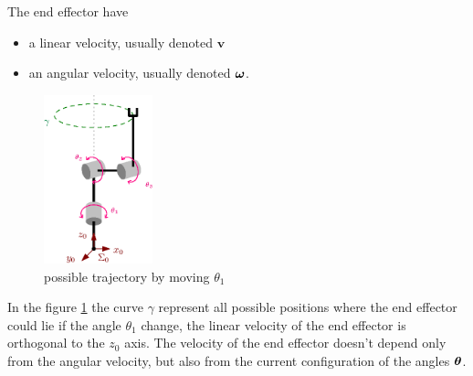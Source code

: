 \documentclass[10pt, letterpaper]{report}
\begin{document}
\noindent The end effector have\begin{itemize}
    \item a linear velocity, usually denoted $\mathbf v$
    \item an angular velocity, usually denoted ${\boldsymbol{\omega}}$.
\end{itemize}
\begin{figure}[h!]
    \centering
    \includegraphics[width=0.28\textwidth ]{images/velocity_new.eps} 
    \caption{possible trajectory by moving $\theta_1$}
    \label{img:velocity_trajectory}
\end{figure}

In the figure \ref{img:velocity_trajectory} the curve $\gamma$ represent all possible positions where the end effector could lie if the angle $\theta_1$ change, the linear velocity of the end effector is orthogonal to the $z_0$ axis. The velocity of the end effector doesn't depend only from the angular velocity, but also from the current configuration of the angles ${\boldsymbol{\theta}}$.\bigskip
\end{document}
